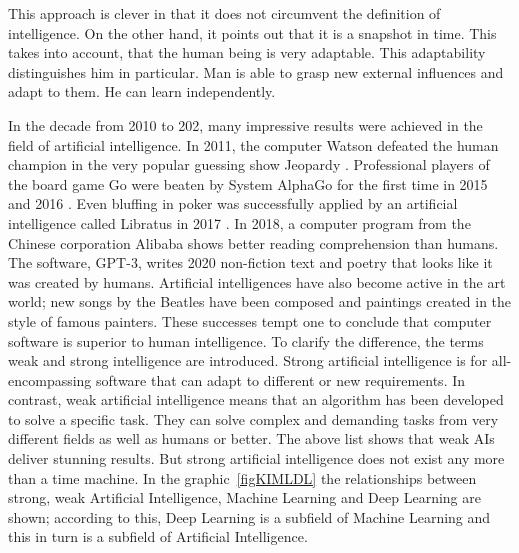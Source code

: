 \bigskip

This approach is clever in that it does not circumvent the definition of intelligence. On the other hand, it points out that it is a snapshot in time. This takes into account,
that the human being is very adaptable. This adaptability distinguishes him in particular. Man is able to grasp new external influences and adapt to them. He can
learn independently.

\bigskip

In the decade from 2010 to 202, many impressive results were achieved in the field of artificial intelligence. In 2011, the computer Watson defeated the human champion in the very popular guessing show \glqq Jeopardy\grqq{} \cite{Ferrucci:2012}. Professional players of the board game Go were beaten by System AlphaGo for the first time in 2015 and 2016 \Cite{Wang:2016}. Even bluffing in poker was successfully applied by an artificial intelligence called Libratus in 2017 \cite{Brown:2018}. In 2018, a computer program from the Chinese corporation Alibaba shows better reading comprehension than humans. The software, GPT-3, writes 2020 non-fiction text and poetry that looks like it was created by humans. Artificial intelligences have also become active in the art world; new songs by the Beatles have been composed and paintings created in the style of famous painters. These successes tempt one to conclude that computer software is superior to human intelligence. To clarify the difference, the terms weak and strong intelligence are introduced. Strong artificial intelligence is for all-encompassing software that can adapt to different or new requirements. In contrast, weak artificial intelligence means that an algorithm has been developed to solve a specific task. They can solve complex and demanding tasks from very different fields as well as humans or better. The above list shows that weak AIs deliver stunning results. But strong artificial intelligence does not exist any more than a time machine.
In the graphic~\ref{figKIMLDL} the relationships between strong, weak Artificial Intelligence, Machine Learning and Deep Learning are shown; according to this, Deep Learning is a subfield of Machine Learning and this in turn is a subfield of Artificial Intelligence.

